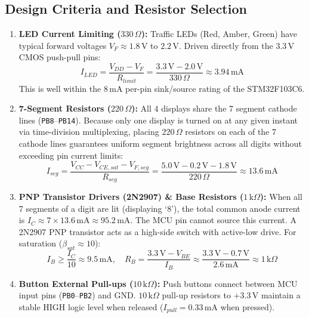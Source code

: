 \documentclass{hcmut-report}
\begin{document}
\subsection{Design Criteria and Resistor Selection}
\begin{enumerate}
    \item \textbf{LED Current Limiting ($330\,\Omega$):}
    Traffic LEDs (Red, Amber, Green) have typical forward voltages $V_F \approx 1.8\,\text{V}$ to $2.2\,\text{V}$. Driven directly from the $3.3\,\text{V}$ CMOS push-pull pins:
    \begin{equation}
        I_{LED} = \frac{V_{DD} - V_F}{R_{limit}} = \frac{3.3\,\text{V} - 2.0\,\text{V}}{330\,\Omega} \approx 3.94\,\text{mA}
    \end{equation}
    This is well within the $8\,\text{mA}$ per-pin sink/source rating of the STM32F103C6.
    
    \item \textbf{7-Segment Resistors ($220\,\Omega$):}
    All 4 displays share the 7 segment cathode lines (\texttt{PB8}--\texttt{PB14}). Because only one display is turned on at any given instant via time-division multiplexing, placing $220\,\Omega$ resistors on each of the 7 cathode lines guarantees uniform segment brightness across all digits without exceeding pin current limits:
    \begin{equation}
        I_{seg} = \frac{V_{CC} - V_{CE,sat} - V_{F,seg}}{R_{seg}} = \frac{5.0\,\text{V} - 0.2\,\text{V} - 1.8\,\text{V}}{220\,\Omega} \approx 13.6\,\text{mA}
    \end{equation}
    
    \item \textbf{PNP Transistor Drivers (2N2907) \& Base Resistors ($1\,\text{k}\Omega$):}
    When all 7 segments of a digit are lit (displaying `8'), the total common anode current is $I_C \approx 7 \times 13.6\,\text{mA} \approx 95.2\,\text{mA}$. The MCU pin cannot source this current. A 2N2907 PNP transistor acts as a high-side switch with active-low drive. For saturation ($\beta_{sat} \approx 10$):
    \begin{equation}
        I_B \ge \frac{I_C}{10} \approx 9.5\,\text{mA}, \quad R_B = \frac{3.3\,\text{V} - V_{BE}}{I_B} \approx \frac{3.3\,\text{V} - 0.7\,\text{V}}{2.6\,\text{mA}} \approx 1\,\text{k}\Omega
    \end{equation}
    
    \item \textbf{Button External Pull-ups ($10\,\text{k}\Omega$):}
    Push buttons connect between MCU input pins (\texttt{PB0}--\texttt{PB2}) and GND. $10\,\text{k}\Omega$ pull-up resistors to $+3.3\,\text{V}$ maintain a stable HIGH logic level when released ($I_{pull} = 0.33\,\text{mA}$ when pressed).
\end{enumerate}
\end{document}
